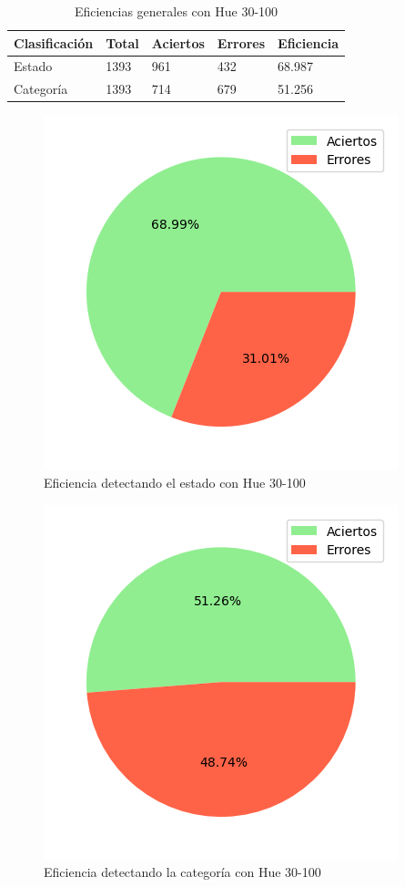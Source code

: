\begin{table}[H]
\centering
\begin{tabular}{|l|l|l|l|l|}
\hline 
\textbf{Clasificación} & \textbf{Total} & \textbf{Aciertos} & \textbf{Errores} & \textbf{Eficiencia} \\
\hline
Estado & 1393 & 961 & 432 & 68.987 \\
\hline 
Categoría & 1393 & 714 & 679 & 51.256 \\
\hline 
\end{tabular}
\caption{Eficiencias generales con Hue 30-100}
\label{table:efficiency_general_30_100}
\end{table}

\captionsetup[figure]{skip=-10pt}

\begin{figure}[H]
\centering
\includegraphics[scale=0.6]{images/result_global_state_30_100.png}
\caption{Eficiencia detectando el estado con Hue 30-100}
\label{img:efficiency_state_30_100}
\end{figure}

\begin{figure}[H]
\centering
\includegraphics[scale=0.6]{images/result_global_class_30_100.png}
\caption{Eficiencia detectando la categoría con Hue 30-100}
\label{img:efficiency_category_30_100}
\end{figure}

